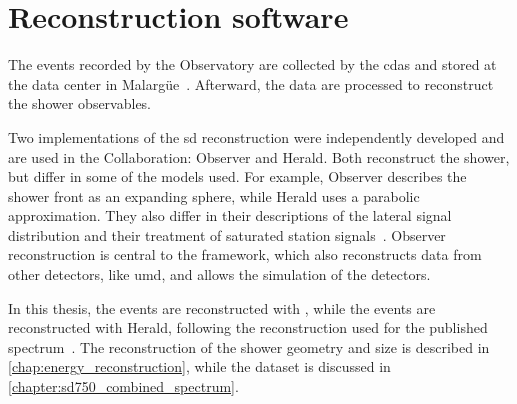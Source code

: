 \documentclass[main.tex]{subfiles}
\begin{document}
\section{Reconstruction software}
\label{sec:auger_reconstruction_software}

The events recorded by the Observatory are collected by the \gls{cdas} and stored at the data center in Malargüe~\cite{PierreAuger:2015:Observatory}.
Afterward, the data are processed to reconstruct the shower observables.

Two implementations of the \gls{sd} reconstruction were independently developed and are used in the Collaboration: Observer and Herald.
Both reconstruct the shower, but differ in some of the models used.
For example, Observer describes the shower front as an expanding sphere, while Herald uses a parabolic approximation.
They also differ in their descriptions of the lateral signal distribution and their treatment of saturated station signals~\cite{PierreAuger:2020:SDReconstruction}.
Observer reconstruction is central to the \Offline framework, which also reconstructs data from other detectors, like \gls{umd}, and allows the simulation of the detectors.

In this thesis, the  events are reconstructed with \Offline, while the  events are reconstructed with Herald, following the reconstruction used for the published  spectrum~\cite{PierreAuger:2021:InfillSpectrum}.
The reconstruction of the  shower geometry and size is described in \cref{chap:energy_reconstruction}, while the  dataset is discussed in \cref{chapter:sd750_combined_spectrum}.
\end{document}
